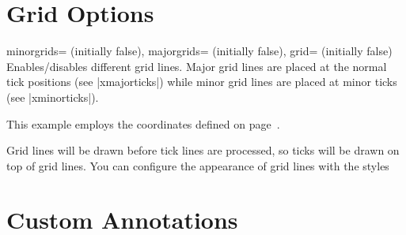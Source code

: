 
\section{Grid Options}

\begin{pgfplotsxykeylist}{%
    \x minorgrids= (initially false),
    \x majorgrids= (initially false),
    grid= (initially false)%
}
    Enables/disables different grid lines. Major grid lines are placed at the
    normal tick positions (see |xmajorticks|) while minor grid lines are placed
    at minor ticks (see |xminorticks|).

    This example employs the coordinates defined on
    page~\pageref{page:plotcoords:src}.
\begin{codeexample}[]
\begin{tikzpicture}
\begin{loglogaxis}[
    xlabel={\textsc{Dof}},
    ylabel={$L_2$ Error},
    grid=major,
]
    \plotcoords
\end{loglogaxis}
\end{tikzpicture}
\end{codeexample}

\begin{codeexample}[]
\end{codeexample}

    Grid lines will be drawn before tick lines are processed, so ticks will be
    drawn on top of grid lines. You can configure the appearance of grid lines
    with the styles
\begin{codeexample}
\end{codeexample}
\end{pgfplotsxykeylist}


\section{Custom Annotations}
\label{sec:pgfplots:annotations}

